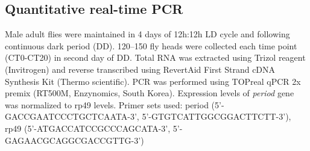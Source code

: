 \subsection*{Quantitative real-time PCR}

Male adult flies were maintained in 4 days of 12h:12h LD cycle and following continuous dark period (DD). 120--150 fly heads were collected each time point (CT0-CT20) in second day of DD.
Total RNA was extracted using Trizol reagent (Invitrogen) and reverse transcribed using RevertAid First Strand cDNA Synthesis Kit (Thermo scientific).
PCR was performed using TOPreal qPCR 2x premix (RT500M, Enzynomics, South Korea). Expression levels of \emph{period} gene was normalized to rp49 levels.
Primer sets used: period (5'-GACCGAATCCCTGCTCAATA-3', 5'-GTGTCATTGGCGGACTTCTT-3'), rp49 (5'-ATGACCATCCGCCCAGCATA-3', 5'-GAGAACGCAGGCGACCGTTG-3')
    
  
  
  
  
  
  